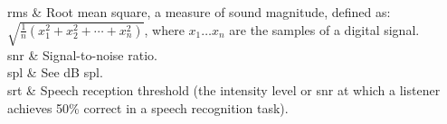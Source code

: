 \begin{table}
\begin{tabu}
		\ac{rms} & Root mean square, a measure of sound magnitude, defined as: \(\sqrt{\frac{1}{n}(x_1^2+x_2^2+\cdots+x_n^2)}\), where \(x_1 \ldots x_n\) are the samples of a digital signal.\\
		\ac{snr} & Signal-to-noise ratio.\\
		\ac{spl} & See {dB \ac{spl}}.\\
		\everyrow{}
		\ac{srt} & Speech reception threshold (the intensity level or \ac{snr} at which a listener achieves 50\% correct in a speech recognition task).\\
		\bottomrule
	\end{tabu}
\end{table}
